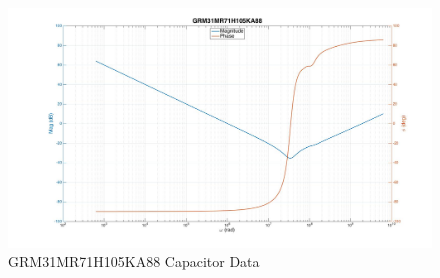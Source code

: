 \begin{figure}[ht!]
\includegraphics[keepaspectratio=true,width=6in]{./figures/regression/exCapData.jpg}
\centering
\caption{GRM31MR71H105KA88 Capacitor Data}
\label{fig:exCapData}
\end{figure}
